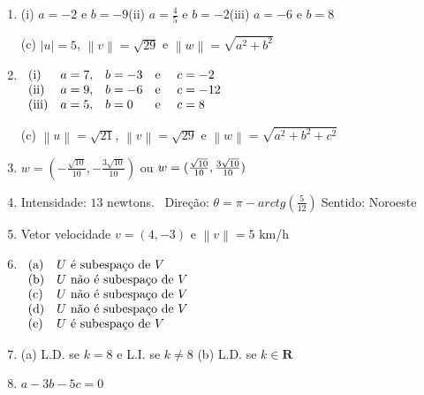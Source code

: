 \documentclass{report}
\begin{document}
\begin{enumerate}
\item  (i) $a=-2$ e $b=-9$\qquad (ii) $a=\frac{4}{5}$ e $b=-2$\qquad (iii) $a=-6
$ e $b=8$

(c) $\left| u\right| =5$, $\left\| v\right\| =\sqrt{29}$ e $\left\|
w\right\| =\sqrt{a^{2}+b^{2}}$

\item  $
\begin{array}[t]{llllll}
\text{(i)} & a=7, & b=-3 & \text{e } & c=-2 &  \\
\text{(ii)} & a=9, & b=-6 & \text{e } & c=-12 &  \\
\text{(iii)} & a=5, & b=0 & \text{e} & c=8 &
\end{array}
$

(c)  $\left\| u\right\| =\sqrt{21}$, $\left\| v\right\| =\sqrt{29}$ e $%
\left\| w\right\| =\sqrt{a^{2}+b^{2}+c^{2}}$

\item  $w=(-\frac{\sqrt{10}}{10},-\frac{3\sqrt{10}}{10})$ ou $w=(\frac{\sqrt{%
10}}{10},\frac{3\sqrt{10}}{10})$

\item  Intensidade: $13$ newtons. \ Dire\c{c}\~{a}o: $\theta =\pi
-arctg\left( \frac{5}{12}\right) \;$Sentido: Noroeste

\item  Vetor velocidade $v=(4,-3)$ e $\left\| v\right\| =5$ km/h

\item  $
\begin{array}[t]{ll}
\text{(a)} & U\text{ \'{e} subespa\c{c}o de }V\newline
\\
\text{(b)} & U\text{ n\~{a}o \'{e} subespa\c{c}o de }V\text{\newline
} \\
\text{(c)} & U\text{ n\~{a}o \'{e} subespa\c{c}o de }V\newline
\\
\text{(d)} & U\text{ n\~{a}o \'{e} subespa\c{c}o de }V\newline
\\
\text{(e)} & U\text{ \'{e} subespa\c{c}o de }V\newline
\end{array}
$

\item  (a) L.D. se $k=8$ e L.I. se $k\neq 8$ \newline
(b) L.D. se $k\in \mathbf{R}$

\item  $a-3b-5c=0$


\end{enumerate}
\end{document}
